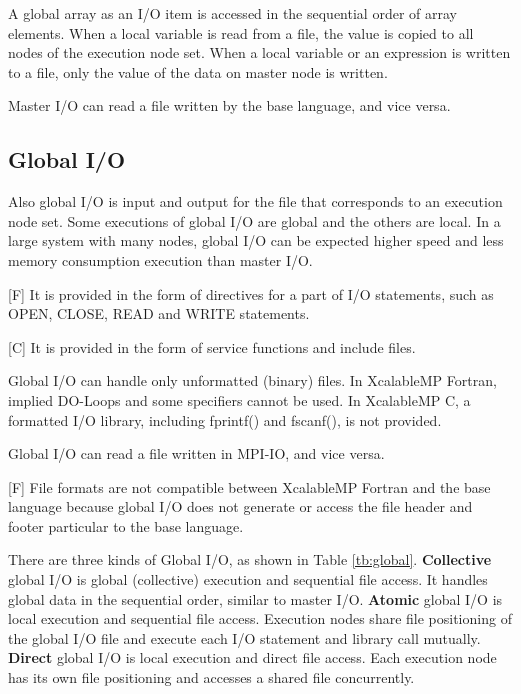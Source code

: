  A global array as an I/O item is accessed in the sequential order of
  array elements.
  When a local variable is read from a file, the value is copied to all
  nodes of the execution node set.
  When a local variable or an expression is written to a file, only the
  value of the data on master node is written.
  
  Master I/O can read a file written by the base language, and vice
  versa.
  

  \subsection{Global I/O}

  Also global I/O is input and output for the file that corresponds to
  an execution node set.
  Some executions of global I/O are global and the others are local.
  In a large system with many nodes, global I/O can be expected higher
  speed and less memory consumption execution than master I/O.

  [F] It is provided in the form of directives for a part of I/O
  statements, such as OPEN, CLOSE, READ
  and WRITE statements.

  [C] It is provided in the form of service functions and include files.

  Global I/O can handle only unformatted (binary) files. In XcalableMP Fortran,
  implied DO-Loops and some specifiers cannot be used.
  In XcalableMP C, a formatted I/O library, including fprintf() and fscanf(), is not provided.

  Global I/O can read a file written in MPI-IO, and vice versa. 

  [F] File formats are not compatible between XcalableMP Fortran
  and the base language because global I/O does not generate or access
  the file header and footer particular to the base language.

  There are three kinds of Global I/O, as shown in Table
  \ref{tb:global}.
  {\bf Collective} global I/O is global (collective) execution and
  sequential file access.
  It handles global data in the sequential order, similar to master
  I/O.
  {\bf Atomic} global I/O is local execution and sequential file access.
  Execution nodes share file positioning of the global I/O file and
  execute each I/O statement and library call mutually.
  {\bf Direct} global I/O is local execution and direct file access.
  Each execution node has its own file positioning and accesses a shared
  file concurrently.

